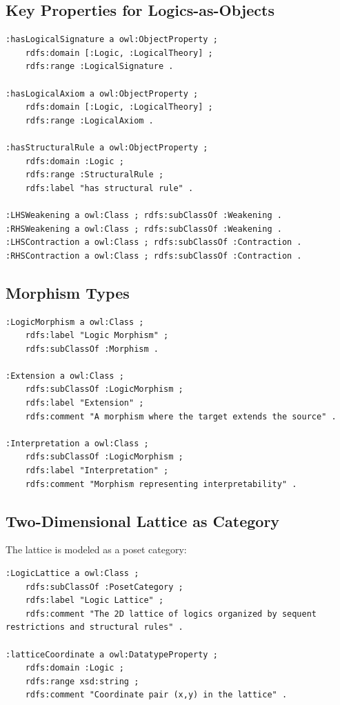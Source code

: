 \subsection{Key Properties for Logics-as-Objects}

\begin{verbatim}
:hasLogicalSignature a owl:ObjectProperty ;
    rdfs:domain [:Logic, :LogicalTheory] ;
    rdfs:range :LogicalSignature .

:hasLogicalAxiom a owl:ObjectProperty ;
    rdfs:domain [:Logic, :LogicalTheory] ;
    rdfs:range :LogicalAxiom .

:hasStructuralRule a owl:ObjectProperty ;
    rdfs:domain :Logic ;
    rdfs:range :StructuralRule ;
    rdfs:label "has structural rule" .

:LHSWeakening a owl:Class ; rdfs:subClassOf :Weakening .
:RHSWeakening a owl:Class ; rdfs:subClassOf :Weakening .
:LHSContraction a owl:Class ; rdfs:subClassOf :Contraction .
:RHSContraction a owl:Class ; rdfs:subClassOf :Contraction .
\end{verbatim}

\subsection{Morphism Types}

\begin{verbatim}
:LogicMorphism a owl:Class ;
    rdfs:label "Logic Morphism" ;
    rdfs:subClassOf :Morphism .

:Extension a owl:Class ;
    rdfs:subClassOf :LogicMorphism ;
    rdfs:label "Extension" ;
    rdfs:comment "A morphism where the target extends the source" .

:Interpretation a owl:Class ;
    rdfs:subClassOf :LogicMorphism ;
    rdfs:label "Interpretation" ;
    rdfs:comment "Morphism representing interpretability" .
\end{verbatim}

\subsection{Two-Dimensional Lattice as Category}

The lattice is modeled as a poset category:

\begin{verbatim}
:LogicLattice a owl:Class ;
    rdfs:subClassOf :PosetCategory ;
    rdfs:label "Logic Lattice" ;
    rdfs:comment "The 2D lattice of logics organized by sequent restrictions and structural rules" .

:latticeCoordinate a owl:DatatypeProperty ;
    rdfs:domain :Logic ;
    rdfs:range xsd:string ;
    rdfs:comment "Coordinate pair (x,y) in the lattice" .
\end{verbatim}

